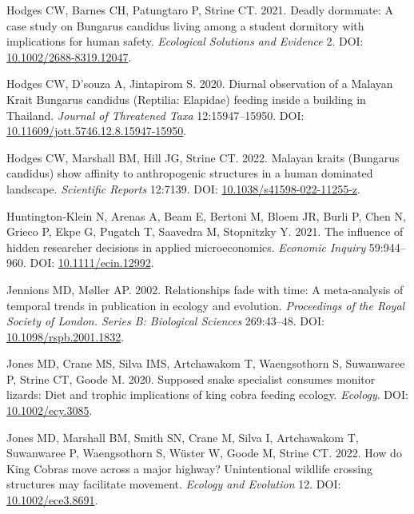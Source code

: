 \documentclass[10pt,a4paper]{article}
\newlength{\cslhangindent}
\newenvironment{CSLReferences}[2] %
 {\begin{list}{}{%
  \setlength{\itemindent}{0pt}
  \setlength{\leftmargin}{0pt}
  \setlength{\parsep}{0pt}
  \ifodd #1
   \setlength{\leftmargin}{\cslhangindent}
   \setlength{\itemindent}{-1\cslhangindent}
  \fi
  \setlength{\itemsep}{#2\baselineskip}}}
 {\end{list}}
\begin{document}
\begin{CSLReferences}{1}{0}
Hodges CW, Barnes CH, Patungtaro P, Strine CT. 2021. Deadly dormmate: {A} case study on {Bungarus} {candidus} living among a student dormitory with implications for human safety. \emph{Ecological Solutions and Evidence} 2. DOI: \href{https://doi.org/10.1002/2688-8319.12047}{10.1002/2688-8319.12047}.

Hodges CW, D'souza A, Jintapirom S. 2020. Diurnal observation of a {Malayan} {Krait} {Bungarus} candidus ({Reptilia}: {Elapidae}) feeding inside a building in {Thailand}. \emph{Journal of Threatened Taxa} 12:15947--15950. DOI: \href{https://doi.org/10.11609/jott.5746.12.8.15947-15950}{10.11609/jott.5746.12.8.15947-15950}.

Hodges CW, Marshall BM, Hill JG, Strine CT. 2022. Malayan kraits ({Bungarus} candidus) show affinity to anthropogenic structures in a human dominated landscape. \emph{Scientific Reports} 12:7139. DOI: \href{https://doi.org/10.1038/s41598-022-11255-z}{10.1038/s41598-022-11255-z}.

Huntington‐Klein N, Arenas A, Beam E, Bertoni M, Bloem JR, Burli P, Chen N, Grieco P, Ekpe G, Pugatch T, Saavedra M, Stopnitzky Y. 2021. The influence of hidden researcher decisions in applied microeconomics. \emph{Economic Inquiry} 59:944--960. DOI: \href{https://doi.org/10.1111/ecin.12992}{10.1111/ecin.12992}.

Jennions MD, Møller AP. 2002. Relationships fade with time: A meta-analysis of temporal trends in publication in ecology and evolution. \emph{Proceedings of the Royal Society of London. Series B: Biological Sciences} 269:43--48. DOI: \href{https://doi.org/10.1098/rspb.2001.1832}{10.1098/rspb.2001.1832}.

Jones MD, Crane MS, Silva IMS, Artchawakom T, Waengsothorn S, Suwanwaree P, Strine CT, Goode M. 2020. Supposed snake specialist consumes monitor lizards: Diet and trophic implications of king cobra feeding ecology. \emph{Ecology}. DOI: \href{https://doi.org/10.1002/ecy.3085}{10.1002/ecy.3085}.

Jones MD, Marshall BM, Smith SN, Crane M, Silva I, Artchawakom T, Suwanwaree P, Waengsothorn S, Wüster W, Goode M, Strine CT. 2022. How do {King} {Cobras} move across a major highway? {Unintentional} wildlife crossing structures may facilitate movement. \emph{Ecology and Evolution} 12. DOI: \href{https://doi.org/10.1002/ece3.8691}{10.1002/ece3.8691}.


\end{CSLReferences}
\end{document}
